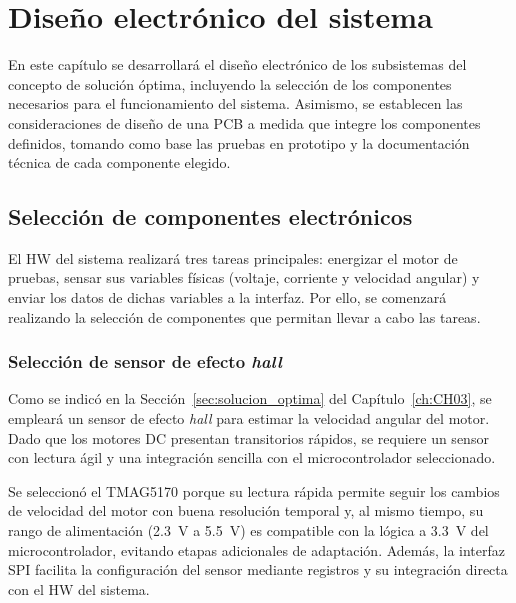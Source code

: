 \chapter{Diseño electrónico del sistema}
\label{ch:CH04}

\noindent
En este capítulo se desarrollará el diseño electrónico de los subsistemas del concepto de solución óptima, incluyendo la selección de los componentes necesarios para el funcionamiento del sistema. Asimismo, se establecen las consideraciones de diseño de una \ac{PCB} a medida que integre los componentes definidos, tomando como base las pruebas en prototipo y la documentación técnica de cada componente elegido.
\section{Selección de componentes electrónicos}

    \noindent
    El \ac{HW} del sistema realizará tres tareas principales: energizar el motor de pruebas, sensar sus variables físicas (voltaje, corriente y velocidad angular) y enviar los datos de dichas variables a la interfaz. Por ello, se comenzará realizando la selección de componentes que permitan llevar a cabo las tareas.

    \subsection{Selección de sensor de efecto \textit{hall}}

        \noindent
        \label{subsec:sel_hall}
        Como se indicó en la Sección~\ref{sec:solucion_optima} del Capítulo~\ref{ch:CH03}, se empleará un sensor de efecto \textit{hall} para estimar la velocidad angular del motor. Dado que los motores \ac{DC} presentan transitorios rápidos, se requiere un sensor con lectura ágil y una integración sencilla con el microcontrolador seleccionado.
        
        Se seleccionó el TMAG5170 porque su lectura rápida permite seguir los cambios de velocidad del motor con buena resolución temporal y, al mismo tiempo, su rango de alimentación (\SI{2.3}{\volt} a \SI{5.5}{\volt}) es compatible con la lógica a \SI{3.3}{\volt} del microcontrolador, evitando etapas adicionales de adaptación. Además, la interfaz \ac{SPI} facilita la configuración del sensor mediante registros y su integración directa con el \ac{HW} del sistema.

